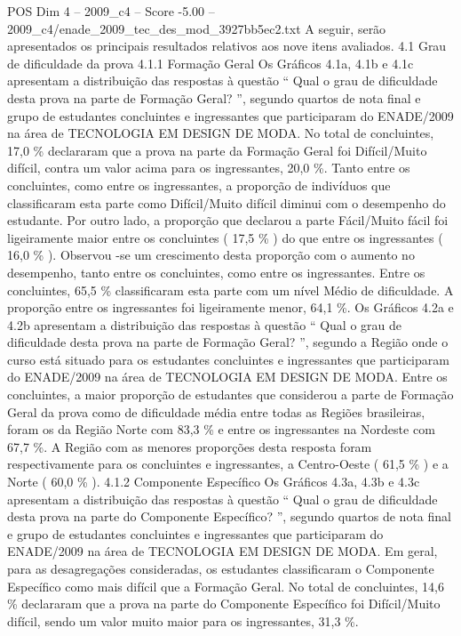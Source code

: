 \begin{textsample}{POS Dim 4 – 2009\_c4 – Score -5.00 – 2009\_c4/enade\_2009\_tec\_des\_mod\_3927bb5ec2.txt}
A seguir, serão apresentados os principais resultados relativos aos nove itens avaliados. 4.1 Grau de dificuldade da prova 4.1.1 Formação Geral Os Gráficos 4.1a, 4.1b e 4.1c apresentam a distribuição das respostas à questão “ Qual o grau de dificuldade desta prova na parte de Formação Geral? ”, segundo quartos de nota final e grupo de estudantes concluintes e ingressantes que participaram do ENADE/2009 na área de TECNOLOGIA EM DESIGN DE MODA.
No total de concluintes, 17,0 \% declararam que a prova na parte da Formação Geral foi Difícil/Muito difícil, contra um valor acima para os ingressantes, 20,0 \%.
Tanto entre os concluintes, como entre os ingressantes, a proporção de indivíduos que classificaram esta parte como Difícil/Muito difícil diminui com o desempenho do estudante.
Por outro lado, a proporção que declarou a parte Fácil/Muito fácil foi ligeiramente maior entre os concluintes ( 17,5 \% ) do que entre os ingressantes ( 16,0 \% ).
Observou -se um crescimento desta proporção com o aumento no desempenho, tanto entre os concluintes, como entre os ingressantes.
Entre os concluintes, 65,5 \% classificaram esta parte com um nível Médio de dificuldade.
A proporção entre os ingressantes foi ligeiramente menor, 64,1 \%.
Os Gráficos 4.2a e 4.2b apresentam a distribuição das respostas à questão “ Qual o grau de dificuldade desta prova na parte de Formação Geral? ”, segundo a Região onde o curso está situado para os estudantes concluintes e ingressantes que participaram do ENADE/2009 na área de TECNOLOGIA EM DESIGN DE MODA.
Entre os concluintes, a maior proporção de estudantes que considerou a parte de Formação Geral da prova como de dificuldade média entre todas as Regiões brasileiras, foram os da Região Norte com 83,3 \% e entre os ingressantes na Nordeste com 67,7 \%.
A Região com as menores proporções desta resposta foram respectivamente para os concluintes e ingressantes, a Centro-Oeste ( 61,5 \% ) e a Norte ( 60,0 \% ). 4.1.2 Componente Específico Os Gráficos 4.3a, 4.3b e 4.3c apresentam a distribuição das respostas à questão “ Qual o grau de dificuldade desta prova na parte do Componente Específico? ”, segundo quartos de nota final e grupo de estudantes concluintes e ingressantes que participaram do ENADE/2009 na área de TECNOLOGIA EM DESIGN DE MODA.
Em geral, para as desagregações consideradas, os estudantes classificaram o Componente Específico como mais difícil que a Formação Geral.
No total de concluintes, 14,6 \% declararam que a prova na parte do Componente Específico foi Difícil/Muito difícil, sendo um valor muito maior para os ingressantes, 31,3 \%.

\end{textsample}
